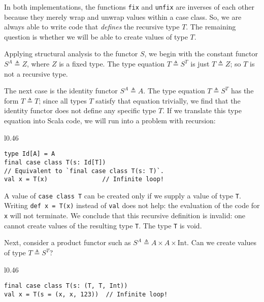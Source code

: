 In both implementations, the functions \lstinline!fix! and \lstinline!unfix!
are inverses of each other because they merely wrap and unwrap values
within a case class. So, we are always able to write code that \emph{defines}
the recursive type $T$. The remaining question is whether we will
be able to create values of type $T$.

Applying structural analysis to the functor $S$, we begin with the
constant functor $S^{A}\triangleq Z$, where $Z$ is a fixed type.
The type equation $T\triangleq S^{T}$ is just $T\triangleq Z$; so
$T$ is not a recursive type.

The next case is the identity functor $S^{A}\triangleq A$. The type
equation $T\triangleq S^{T}$ has the form $T\triangleq T$; since
all types $T$ satisfy that equation trivially, we find that the identity
functor does not define any specific type $T$. If we translate this
type equation into Scala code, we will run into a problem with recursion:

\begin{wrapfigure}{l}{0.46\columnwidth}%
\vspace{-1\baselineskip}
\begin{lstlisting}
type Id[A] = A
final case class T(s: Id[T])
// Equivalent to `final case class T(s: T)`.
val x = T(x)               // Infinite loop!
\end{lstlisting}

\vspace{-1.15\baselineskip}
\end{wrapfigure}%

\noindent A value of \lstinline!case class T! can be created only
if we supply a value of type \lstinline!T!. Writing \lstinline!def x = T(x)!
instead of \lstinline!val! does not help: the evaluation of the code
for \lstinline!x! will not terminate. We conclude that this recursive
definition is invalid: one cannot create values of the resulting type
\lstinline!T!. The type \lstinline!T! is void.

Next, consider a product functor such as $S^{A}\triangleq A\times A\times\text{Int}$.
Can we create values of type $T\triangleq S^{T}$?

\begin{wrapfigure}{l}{0.46\columnwidth}%
\vspace{-0.8\baselineskip}
\begin{lstlisting}
final case class T(s: (T, T, Int))
val x = T(s = (x, x, 123))  // Infinite loop!
\end{lstlisting}

\vspace{-1\baselineskip}
\end{wrapfigure}%

